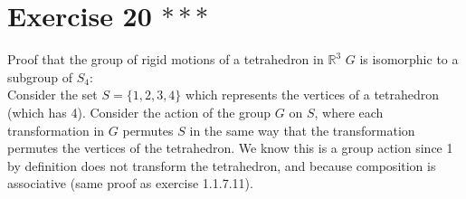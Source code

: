 \documentclass{article}
\newcommand{\R}{\mathbb{R}}
\begin{document}
    \section*{Exercise 20 $***$}
    Proof that the group of rigid motions of a tetrahedron in $\R^3$ $G$
    is isomorphic to a subgroup of $S_4$: \\
    Consider the set $S = \{1, 2, 3 ,4\}$ which represents the vertices of
    a tetrahedron (which has 4).
    Consider the action of the group $G$ on $S$,
    where each transformation in $G$ permutes $S$ in the same way that
    the transformation permutes the vertices of the tetrahedron.
    We know this is a group action since 1 by definition does not transform 
    the tetrahedron,
    and because composition is associative
    (same proof as exercise 1.1.7.11). \\
\end{document}
